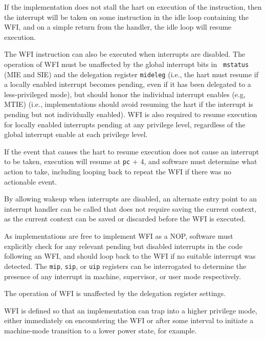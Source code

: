 \begin{commentary}
If the implementation does not stall the hart on execution of the
instruction, then the interrupt will be taken on some instruction in
the idle loop containing the WFI, and on a simple return from the
handler, the idle loop will resume execution.
\end{commentary}

The WFI instruction can also be executed when interrupts are disabled.  The
operation of WFI must be unaffected by the global interrupt bits in {\tt
mstatus} (MIE and SIE) and the delegation register {\tt mideleg}
(i.e., the hart must resume if a locally enabled interrupt becomes pending,
even if it has been delegated to a less-privileged mode), but should honor the
individual interrupt enables (e.g, MTIE) (i.e., implementations should
avoid resuming the hart if the interrupt is pending but not
individually enabled).  WFI is also required to resume execution for
locally enabled interrupts pending at any privilege level, regardless
of the global interrupt enable at each privilege level.

If the event that causes the hart to resume execution does not cause
an interrupt to be taken, execution will resume at {\tt pc} + 4, and
software must determine what action to take, including looping back to
repeat the WFI if there was no actionable event.

\begin{commentary}
By allowing wakeup when interrupts are disabled, an alternate entry
point to an interrupt handler can be called that does not require
saving the current context, as the current context can be saved or
discarded before the WFI is executed.

As implementations are free to implement WFI as a NOP, software must
explicitly check for any relevant pending but disabled interrupts in
the code following an WFI, and should loop back to the WFI if no
suitable interrupt was detected.  The {\tt mip}, {\tt sip},
or {\tt uip} registers can be interrogated to determine the presence
of any interrupt in machine, supervisor, or user mode
respectively.

The operation of WFI is unaffected by the delegation register settings.

WFI is defined so that an implementation can trap into a higher
privilege mode, either immediately on encountering the WFI or after
some interval to initiate a machine-mode transition to a lower power
state, for example.
\end{commentary}

